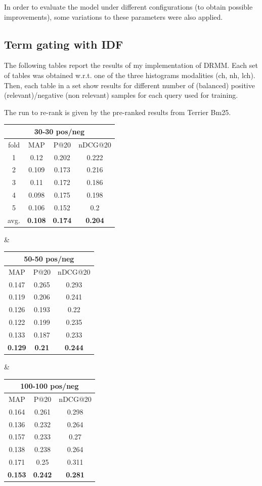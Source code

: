 In order to evaluate the model under different configurations (to obtain possible improvements), some variations to these parameters were also applied.

\subsection{Term gating with IDF}
\label{ssec:tgidf}

The following tables report the results of my implementation of DRMM. Each set of tables was obtained w.r.t. one of the three histograms modalities (ch, nh, lch). Then, each table in a set show results for different number of (balanced) positive (relevant)/negative (non relevant) samples for each query used for training.

The run to re-rank is given by the pre-ranked results from Terrier Bm25.

\begin{adjustbox}{center, tabular=ccc, caption={DRMM runs (count-based histograms), IDF weighting, stemmed with stopwords removal}, nofloat=table}
\centering
\begin{tabular}{c|ccc}
\hline
\multicolumn{4}{c}{30-30 pos/neg} \\ \hline
fold & MAP & P@20 & nDCG@20 \\ \hline
1 & 0.12 & 0.202 & 0.222 \\
2 & 0.109 & 0.173 & 0.216 \\
3 & 0.11 & 0.172 & 0.186 \\
4 & 0.098 & 0.175 & 0.198 \\
5 & 0.106 & 0.152 & 0.2 \\ \hline
avg. & \textbf{0.108} & \textbf{0.174} & \textbf{0.204} \\
\hline
\end{tabular} &
\begin{tabular}{ccc}
\hline
\multicolumn{3}{c}{50-50 pos/neg} \\ \hline
MAP & P@20 & nDCG@20 \\ \hline
0.147 & 0.265 & 0.293 \\
0.119 & 0.206 & 0.241 \\
0.126 & 0.193 & 0.22 \\
0.122 & 0.199 & 0.235 \\
0.133 & 0.187 & 0.233 \\ \hline
\textbf{0.129} & \textbf{0.21} & \textbf{0.244} \\
\hline
\end{tabular} &
\begin{tabular}{ccc}
\hline
\multicolumn{3}{c}{100-100 pos/neg} \\ \hline
MAP & P@20 & nDCG@20 \\ \hline
0.164 & 0.261 & 0.298 \\
0.136 & 0.232 & 0.264 \\
0.157 & 0.233 & 0.27 \\
0.138 & 0.238 & 0.264 \\
0.171 & 0.25 & 0.311 \\ \hline
\textbf{0.153} & \textbf{0.242} & \textbf{0.281} \\
\hline
\end{tabular}
\label{tab:chsamp}
\end{adjustbox}

